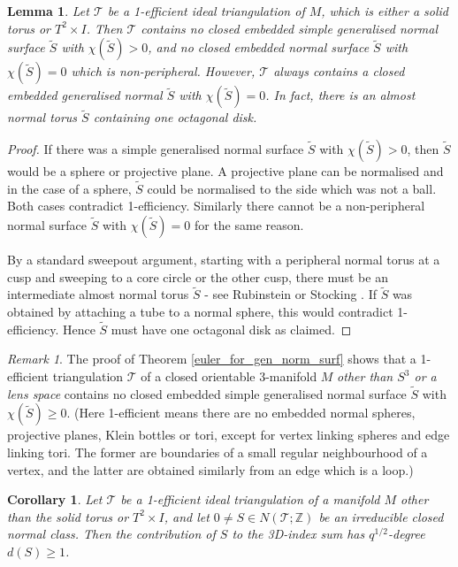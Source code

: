 \documentclass[12pt,reqno]{amsart}  %
\newtheorem{lemma}[thm]{Lemma}
\newtheorem{cor}[thm]{Corollary}
\theoremstyle{definition}
\theoremstyle{remark}
\newtheorem{rmk}[thm]{Remark}
\newcommand{\T}{\mathcal{T}}
\def\Z{\mathbb Z}
\begin{document}
\begin{lemma} 
\label{solid_torus_gen_norm}
Let $\T$ be a 1-efficient ideal triangulation of $M$, which is either a 
solid torus or $T^2 \times I$. Then $\T$ contains no closed embedded 
simple generalised normal surface $\tilde S$ with $\chi(\tilde S) > 0$,
and no closed embedded normal surface $\tilde S$ with $\chi(\tilde S) = 0$ 
which is non-peripheral. However, $\T$ always contains a closed embedded 
generalised normal $\tilde S$ with $\chi(\tilde S) = 0$.
In fact, there is an almost normal torus $\tilde S$ containing one 
octagonal disk.
\end{lemma}

\begin{proof} 
If there was a simple generalised normal surface $\tilde S$ with 
$\chi(\tilde S) > 0$, then $\tilde S$ would be a sphere or projective 
plane. A projective plane can be normalised and in the case of a sphere, 
$\tilde S$ could be normalised to the side which was not a ball. Both cases 
contradict 1-efficiency. Similarly there cannot be a non-peripheral normal 
surface $\tilde S$ with $\chi(\tilde S) = 0$ for the same reason. 

By a standard sweepout argument, starting with a peripheral normal torus 
at a cusp and sweeping to a core circle or the other cusp, there must be 
an intermediate almost normal torus $\tilde S$ - see Rubinstein \cite{Ru} 
or Stocking \cite{St}. If $\tilde S$ was obtained by attaching a tube to 
a normal sphere, this would contradict 1-efficiency. Hence $\tilde S$ must 
have one octagonal disk as claimed. 
\end{proof}

\begin{rmk} 
The proof of Theorem \ref{euler_for_gen_norm_surf} shows that a 1-efficient 
triangulation $\T$ of a closed orientable 3-manifold $M$ 
{\em other than $S^3$ or a lens space} contains no closed embedded simple 
generalised normal surface $\tilde S$ with $\chi(\tilde S) \ge 0$. 
(Here 1-efficient means there are no embedded normal spheres, projective 
planes, Klein bottles or tori, except for vertex linking spheres and 
edge linking tori. The former are boundaries of a small regular 
neighbourhood of a vertex, and the latter are obtained similarly from an 
edge which is a loop.) 
\end{rmk}

\begin{cor}
\label{1-efficient_degrees}
Let $\T$ be a 1-efficient ideal triangulation of a manifold $M$ other 
than the solid torus or $T^2 \times I$, and let $0\ne S \in N(\T;\Z)$ be 
an irreducible closed normal class. Then the contribution of $S$ to the 
3D-index sum has $q^{1/2}$-degree $d(S) \ge 1$.
\end{cor}
\end{document}
